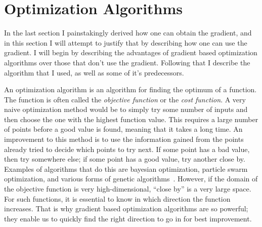 
\section{Optimization Algorithms}

In the last section I painstakingly derived how one can obtain the gradient,
and in this section I will attempt to justify that by describing how one can use
the gradient.
I will begin by describing the advantages of gradient based optimization
algorithms over those that don't use the gradient.
Following that I describe the algorithm that I used, as well as some of it's
predecessors.

An optimization algorithm is an algorithm for finding the optimum of a function.
The function is often called the \emph{objective function} or the \emph{cost
function}.
A very naive optimization method would be to simply try some number of inputs
and then choose the one with the highest function value.
This requires a large number of points before a good value is found,
meaning that it takes a long time.
An improvement to this method is to use the information gained from the points
already tried to decide which points to try next.
If some point has a bad value, then try somewhere else; if some point has a good
value, try another close by.
Examples of algorithms that do this are bayesian optimization, particle swarm
optimization, and various forms of genetic
algorithms~\cite{schneider2019benchmarking}.
However, if the domain of the objective function is very high-dimensional,
``close by'' is a very large space.
For such functions, it is essential to know in which direction the
function increases.
That is why gradient based optimization algorithms are so powerful;
they enable us to quickly find the right direction to go in for best
improvement.

